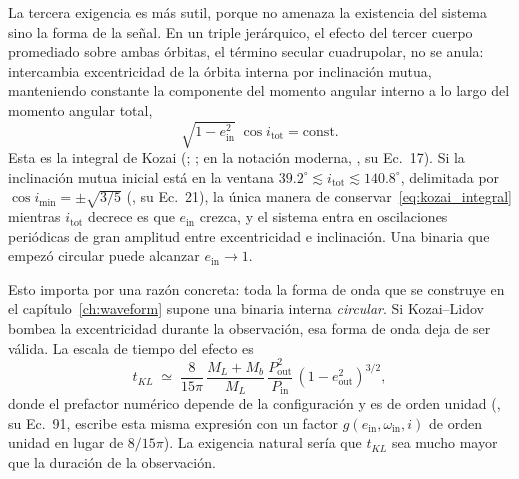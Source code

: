 \documentclass[11pt,a4paper,openany]{book}
\begin{document}
La tercera exigencia es m\'as sutil, porque no amenaza la existencia del
sistema sino la forma de la se\~nal. En un triple jer\'arquico, el efecto del
tercer cuerpo promediado sobre ambas \'orbitas, el t\'ermino secular
cuadrupolar, no se anula: intercambia excentricidad de la \'orbita interna por
inclinaci\'on mutua, manteniendo constante la componente del momento angular
interno a lo largo del momento angular total,
\begin{equation}
  \sqrt{1-e_\mathrm{in}^{2}}\;\cos i_\mathrm{tot}=\text{const.}
  \label{eq:kozai_integral}
\end{equation}
Esta es la integral de Kozai (\citealp{Kozai1962}; \citealp{Lidov1962};
en la notaci\'on moderna, \citealp{Naoz2016}, su Ec.~17). Si la inclinaci\'on
mutua inicial est\'a en la ventana
$39.2^{\circ}\lesssim i_\mathrm{tot}\lesssim 140.8^{\circ}$, delimitada por
$\cos i_\mathrm{min}=\pm\sqrt{3/5}$ (\citealp{Naoz2016}, su Ec.~21), la
\'unica manera de conservar~\eqref{eq:kozai_integral} mientras
$i_\mathrm{tot}$ decrece es que $e_\mathrm{in}$ crezca, y el sistema entra en
oscilaciones peri\'odicas de gran amplitud entre excentricidad e
inclinaci\'on. Una binaria que empez\'o circular puede alcanzar
$e_\mathrm{in}\to1$.

Esto importa por una raz\'on concreta: toda la forma de onda que se construye
en el cap\'itulo~\ref{ch:waveform} supone una binaria interna \emph{circular}.
Si Kozai--Lidov bombea la excentricidad durante la observaci\'on, esa forma de
onda deja de ser v\'alida. La escala de tiempo del efecto es
\begin{equation}
  t_{KL}\;\simeq\;\frac{8}{15\pi}\,
  \frac{M_L+M_b}{M_L}\,
  \frac{P_\mathrm{out}^{2}}{P_\mathrm{in}}\,
  \left(1-e_\mathrm{out}^{2}\right)^{3/2},
  \label{eq:tkl}
\end{equation}
donde el prefactor num\'erico depende de la configuraci\'on y es de orden
unidad (\citealp{MardlingAarseth2001}, su Ec.~91, escribe esta misma
expresi\'on con un factor $g(e_\mathrm{in},\omega_\mathrm{in},i)$ de orden
unidad en lugar de $8/15\pi$). La exigencia natural ser\'ia que $t_{KL}$ sea
mucho mayor que la duraci\'on de la observaci\'on.
\end{document}
